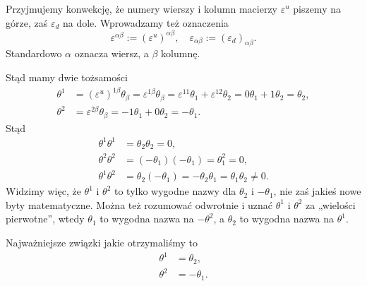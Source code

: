 \documentclass[a4paper,11pt]{article}
\begin{document}
Przyjmujemy konwekcję, że numery wierszy i kolumn macierzy $\varepsilon^{ u }$ piszemy na górze, zaś $\varepsilon_{ d }$ na dole. Wprowadzamy też oznaczenia
\begin{equation}
  \label{eq:Zmienne-Grassmana-14}
  \varepsilon^{ \alpha \beta } := ( \varepsilon^{ u } )^{ \alpha \beta }, \quad
  \varepsilon_{ \alpha \beta } := ( \varepsilon_{ d } )_{ \alpha \beta }.
\end{equation}
Standardowo $\alpha$ oznacza wiersz, a $\beta$ kolumnę.

Stąd mamy dwie tożsamości
\begin{subequations}
  \begin{align}
    \label{eq:Zmienne-Grassmana-15-A}
    \theta^{ 1 }
    &= ( \varepsilon^{ u } )^{ 1 \beta } \theta_{ \beta } = \varepsilon^{ 1 \beta } \theta_{ \beta }
      = \varepsilon^{ 1 1 } \theta_{ 1 } + \varepsilon^{ 1 2 } \theta_{ 2 }
      = 0 \theta_{ 1 } + 1 \theta_{ 2 } = \theta_{ 2 }, \\
    \label{eq:Zmienne-Grassmana-15-B}
    \theta^{ 2 } &= \varepsilon^{ 2 \beta } \theta_{ \beta } = -1 \theta_{ 1 } + 0 \theta_{ 2 } = -\theta_{ 1 }.
  \end{align}
\end{subequations}
Stąd
\begin{subequations}
  \begin{align}
    \label{eq:Zmienne-Grassmana-16-A}
    \theta^{ 1 } \theta^{ 1 }
    &= \theta_{ 2 } \theta_{ 2 } = 0, \\
    \label{eq:Zmienne-Grassmana-16-B}
    \theta^{ 2 } \theta^{ 2 }
    &= ( -\theta_{ 1 } ) ( -\theta_{ 1 } ) = \theta_{ 1 }^{ 2 } = 0, \\
    \label{eq:Zmienne-Grassmana-16-C}
    \theta^{ 1 } \theta^{ 2 }
    &= \theta_{ 2 } ( -\theta_{ 1 } ) = -\theta_{ 2 } \theta_{ 1 } = \theta_{ 1 } \theta_{ 2 } \neq 0.
  \end{align}
\end{subequations}
Widzimy więc, że $\theta^{ 1 }$ i $\theta^{ 2 }$ to tylko wygodne nazwy dla $\theta_{ 2 }$ i $-\theta_{ 1 }$, nie zaś jakieś nowe byty matematyczne. Można też rozumować odwrotnie i uznać $\theta^{ 1 }$ i $\theta^{ 2 }$ za „wielości pierwotne”, wtedy $\theta_{ 1 }$ to wygodna nazwa na $-\theta^{ 2 }$, a $\theta_{ 2 }$ to wygodna nazwa na $\theta^{ 1 }$.

Najważniejsze związki jakie otrzymaliśmy to
\begin{subequations}
  \begin{align}
    \label{eq:Zmienne-Grassmana-17-A}
    \theta^{ 1 } &= \theta_{ 2 }, \\
    \label{eq:Zmienne-Grassmana-17-B}
    \theta^{ 2 } &= -\theta_{ 1 }.
  \end{align}
\end{subequations}
\end{document}
